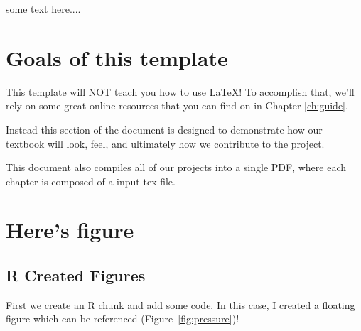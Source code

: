 \documentclass{book}\usepackage{knitr}
\begin{document}
some text here....

\section{Goals of this template}

This template will NOT teach you how to use \LaTeX! To accomplish that, we'll rely on some great online resources that you can find on in Chapter \ref{ch:guide}. 

Instead this section of the document is designed to demonstrate how our textbook will look, feel, and ultimately how we contribute to the project.

This document also compiles all of our projects into a single PDF, where each chapter is composed of a input tex file.

\section{Here's figure}

\subsection{R Created Figures}

First we create an R chunk and add some code. In this case, I created a floating figure which can be referenced (Figure~\ref{fig:pressure})!  
\end{document}
